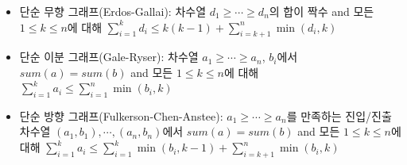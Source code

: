 \begin{itemize}[noitemsep]

    \item 단순 무향 그래프(Erdos-Gallai): 차수열 $d_1 \geq \cdots \geq d_n$의 합이 짝수 and 모든 $1 \leq k \leq n$에 대해 $\sum_{i=1}^{k} d_i \leq k(k-1) + \sum_{i=k+1}^{n} \min(d_i, k)$

    \item 단순 이분 그래프(Gale-Ryser): 차수열 $a_1 \geq \cdots \geq a_n$, $b_i$에서 $sum(a) = sum(b)$ and 모든 $1 \leq k \leq n$에 대해 $\sum_{i=1}^{k} a_i \leq \sum_{i=1}^{n} \min(b_i,k)$

    \item 단순 방향 그래프(Fulkerson-Chen-Anstee): $a_1 \geq \cdots \geq a_n$를 만족하는 진입/진출 차수열 $(a_1,b_1), \cdots, (a_n, b_n)$에서 $sum(a) = sum(b)$ and 모든 $1 \leq k \leq n$에 대해 $\sum_{i=1}^{k} a_i \leq \sum_{i=1}^{k} \min(b_i, k-1) + \sum_{i=k+1}^{n} \min(b_i, k)$
\end{itemize}